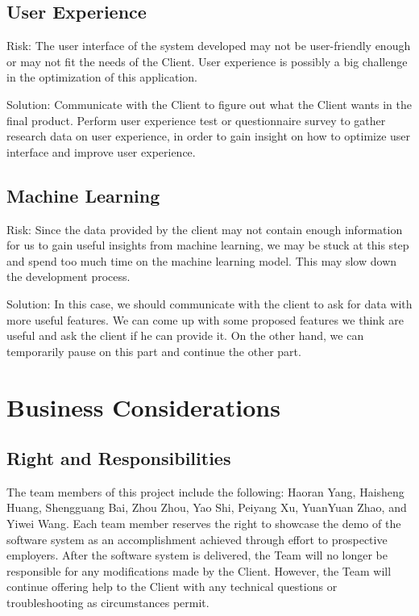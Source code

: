 \documentclass{article}
\begin{document}
\subsection{User Experience}
Risk: The user interface of the system developed may not be user-friendly enough or may not fit the needs of the Client. User experience is possibly a big challenge in the optimization of this application.

\vspace{0.4cm}Solution: Communicate with the Client to figure out what the Client wants in the final product. Perform user experience test or questionnaire survey to gather research data on user experience, in order to gain insight on how to optimize user interface and improve user experience.

\subsection{Machine Learning}
Risk: Since the data provided by the client may not contain enough information for us to gain useful insights from machine learning, we may be stuck at this step and spend too much time on the machine learning model. This may slow down the development process.

\vspace{0.4cm}Solution: In this case, we should communicate with the client to ask for data with more useful features. We can come up with some proposed features we think are useful and ask the client if he can provide it. On the other hand, we can temporarily pause on this part and continue the other part. 

\section{Business Considerations}
\subsection{Right and Responsibilities}
The team members of this project include the following: Haoran Yang, Haisheng Huang, Shengguang Bai, Zhou Zhou, Yao Shi, Peiyang Xu, YuanYuan Zhao, and Yiwei Wang. Each team member reserves the right to showcase the demo of the software system as an accomplishment achieved through effort to prospective employers. After the software system is delivered, the Team will no longer be responsible for any modifications made by the Client. However, the Team will continue offering help to the Client with any technical questions or troubleshooting as circumstances permit.
\end{document}

